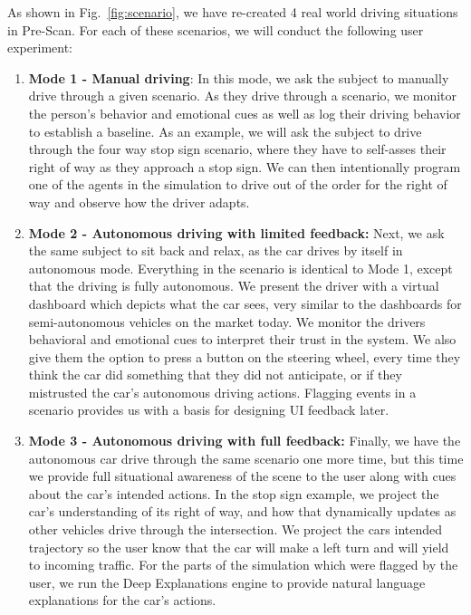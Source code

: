 As shown in Fig.~\ref{fig:scenario}, we have re-created 4 real world driving situations in Pre-Scan.
For each of these scenarios, we will conduct the following user experiment:
\begin{enumerate}[itemsep=0pt,parsep=0pt,topsep=4pt,leftmargin=0.4in]
    \item \textbf{Mode 1 - Manual driving}: In this mode, we ask the subject to manually drive through a given scenario. 
    As they drive through a scenario, we monitor the person's behavior and emotional cues as well as log their driving behavior to establish a baseline. 
    As an example, we will ask the subject to drive through the four way stop sign scenario, where they have to self-asses their right of way as they approach a stop sign. We can then intentionally program one of the agents in the simulation to drive out of the order for the right of way and observe how the driver adapts. 
    \item \textbf{Mode 2 - Autonomous driving with limited feedback:} Next, we ask the same subject to sit back and relax, as the car drives by itself in autonomous mode. Everything in the scenario is identical to Mode 1, except that the driving is fully autonomous. We present the driver with a virtual dashboard which depicts what the car sees, very similar to the dashboards for semi-autonomous vehicles on the market today.  We monitor the drivers behavioral and emotional cues to interpret their trust in the system. We also give them the option to press a button on the steering wheel, every time they think the car did something that they did not anticipate, or if they mistrusted the car's autonomous driving actions. Flagging events in a scenario provides us with a basis for designing UI feedback later.
    \item \textbf{Mode 3 - Autonomous driving with full feedback:} Finally, we have the autonomous car drive through the same scenario one more time, but this time we provide full situational awareness of the scene to the user along with cues about the car's intended actions. In the stop sign example, we project the car's understanding of its right of way, and how that dynamically updates as other vehicles drive through the intersection. We project the cars intended trajectory so the user know that the car will make a left turn and will yield to incoming traffic. For the parts of the simulation which were flagged by the user, we run the Deep Explanations engine to provide natural language explanations for the car's actions. 
\end{enumerate}
